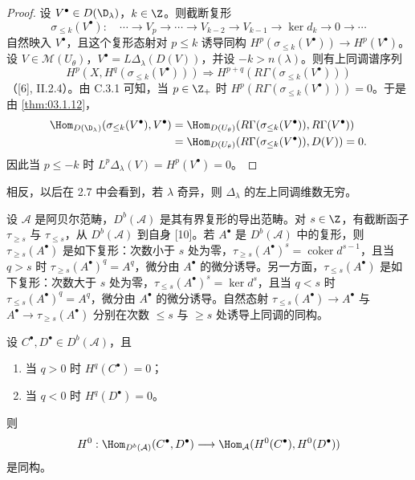 \begin{proof}
设 $V^\bullet\in D(\D_\lambda)$，$k\in\Z$。则截断复形
$$\sigma_{\le k}(V^\bullet):\quad\cdots\longrightarrow V_p\longrightarrow\cdots\longrightarrow V_{k-2}\longrightarrow V_{k-1}\longrightarrow\ker d_k\longrightarrow 0\longrightarrow\cdots$$
自然映入 $V^\bullet$，且这个复形态射对 $p\le k$ 诱导同构 $H^p(\sigma_{\le k}(V^\bullet))\to H^p(V^\bullet)$。设 $V\in\mathcal{M}(U_\theta)$，$V^\bullet=L\Delta_\lambda(D(V))$，并设 $-k>n(\lambda)$。则有上同调谱序列
$$H^p(X,H^q(\sigma_{\le k}(V^\bullet)))\Longrightarrow H^{p+q}(R\Gamma(\sigma_{\le k}(V^\bullet)))$$
（[6], II.2.4）。由 C.3.1 可知，当 $p\in\Z_+$ 时 $H^p(R\Gamma(\sigma_{\le k}(V^\bullet)))=0$。于是由 \ref{thm:03.1.12}，
\begin{align*}
\Hom_{D(\D_\lambda)}(\sigma_{\le k}(V^\bullet),V^\bullet)
&=\Hom_{D(U_\theta)}(R\Gamma(\sigma_{\le k}(V^\bullet)),R\Gamma(V^\bullet))\\
&=\Hom_{D(U_\theta)}(R\Gamma(\sigma_{\le k}(V^\bullet)),D(V))=0.
\end{align*}
因此当 $p\le -k$ 时 $L^p\Delta_\lambda(V)=H^p(V^\bullet)=0$。
\end{proof}

\begin{remark}\label{rem:03.1.14}
相反，以后在 2.7 中会看到，若 $\lambda$ 奇异，则 $\Delta_\lambda$ 的左上同调维数无穷。
\end{remark}

设 $\mathcal{A}$ 是阿贝尔范畴，$D^b(\mathcal{A})$ 是其有界复形的导出范畴。对 $s\in\Z$，有截断函子 $\tau_{\ge s}$ 与 $\tau_{\le s}$，从 $D^b(\mathcal{A})$ 到自身 [10]。若 $A^\bullet$ 是 $D^b(\mathcal{A})$ 中的复形，则 $\tau_{\ge s}(A^\bullet)$ 是如下复形：次数小于 $s$ 处为零，$\tau_{\ge s}(A^\bullet)^s=\operatorname{coker} d^{s-1}$，且当 $q>s$ 时 $\tau_{\ge s}(A^\bullet)^q=A^q$，微分由 $A^\bullet$ 的微分诱导。另一方面，$\tau_{\le s}(A^\bullet)$ 是如下复形：次数大于 $s$ 处为零，$\tau_{\le s}(A^\bullet)^s=\ker d^s$，且当 $q<s$ 时 $\tau_{\le s}(A^\bullet)^q=A^q$，微分由 $A^\bullet$ 的微分诱导。自然态射 $\tau_{\le s}(A^\bullet)\to A^\bullet$ 与 $A^\bullet\to\tau_{\ge s}(A^\bullet)$ 分别在次数 $\le s$ 与 $\ge s$ 处诱导上同调的同构。

\begin{lemma}\label{lem:03.1.15}
设 $C^\bullet,D^\bullet\in D^b(\mathcal{A})$，且
\begin{enumerate}[label=(\roman*),leftmargin=2.6em,itemsep=0.1em]
\item 当 $q>0$ 时 $H^q(C^\bullet)=0$；
\item 当 $q<0$ 时 $H^q(D^\bullet)=0$。
\end{enumerate}
则
$$H^0:\Hom_{D^b(\mathcal{A})}(C^\bullet,D^\bullet)\longrightarrow\Hom_{\mathcal{A}}(H^0(C^\bullet),H^0(D^\bullet))$$
是同构。
\end{lemma}

